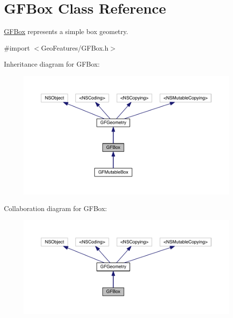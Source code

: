 \hypertarget{interface_g_f_box}{}\section{G\+F\+Box Class Reference}
\label{interface_g_f_box}


\hyperlink{interface_g_f_box}{G\+F\+Box} represents a simple box geometry.  




{\ttfamily \#import $<$Geo\+Features/\+G\+F\+Box.\+h$>$}



Inheritance diagram for G\+F\+Box\+:\nopagebreak
\begin{figure}[H]
\begin{center}
\leavevmode
\includegraphics[width=350pt]{interface_g_f_box__inherit__graph}
\end{center}
\end{figure}


Collaboration diagram for G\+F\+Box\+:\nopagebreak
\begin{figure}[H]
\begin{center}
\leavevmode
\includegraphics[width=350pt]{interface_g_f_box__coll__graph}
\end{center}
\end{figure}
